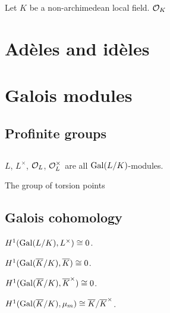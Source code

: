 \documentclass{../../large}
\begin{document}
\begin{prb}[Places]
\end{prb}

\begin{prb}
Let $K$ be a non-archimedean local field.
$\mathcal{O}_K$

\end{prb}


\chapter{Ad\`eles and id\`eles}


\chapter{Galois modules}
\section{Profinite groups}

\section{}

\begin{prb}
\begin{parts}
\item $L$, $L^\times$, $\mathcal{O}_L$, $\mathcal{O}_L^\times$ are all $\operatorname{Gal}(L/K)$-modules.
\item The group of torsion points
\end{parts}
\end{prb}

\begin{prb}
\end{prb}


\section{Galois cohomology}
\begin{prb}
\end{prb}

\begin{prb}
\end{prb}

\begin{prb}[Hilbert 90]
\begin{parts}
\item $H^1(\operatorname{Gal}(L/K),L^\times)\cong0$.
\item $H^1(\operatorname{Gal}(\overline K/K),\overline K)\cong0$.
\item $H^1(\operatorname{Gal}(\overline K/K),\overline K^\times)\cong0$.
\item $H^1(\operatorname{Gal}(\overline K/K),\mu_m)\cong\overline K/\overline K^\times$.
\end{parts}
\end{prb}
\begin{pf}
\end{pf}
\end{document}
